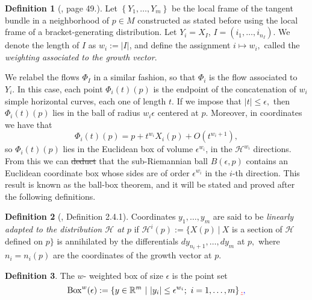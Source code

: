 \documentclass[12pt, letterpaper, reqno]{amsart}
\theoremstyle{definition}
\newtheorem{df}{Definition}
\theoremstyle{plain}
\theoremstyle{remark}
\providecommand{\DIFadd}[1]{{\protect\color{blue}\uwave{#1}}} %
\providecommand{\DIFdel}[1]{{\protect\color{red}\sout{#1}}}                      %
\providecommand{\DIFaddbegin}{} %
\providecommand{\DIFaddend}{} %
\providecommand{\DIFdelbegin}{} %
\providecommand{\DIFdelend}{} %
\newcommand{\DIFscaledelfig}{0.5}
\newlength{\DIFdelgraphicswidth} %
\newlength{\DIFdelgraphicsheight} %
\newcommand{\DIFaddincludegraphics}[2][]{{\color{blue}\fbox{\DIFOincludegraphics[#1]{#2}}}} %
\newcommand{\DIFdelincludegraphics}[2][]{%
\sbox{\DIFdelgraphicsbox}{\DIFOincludegraphics[#1]{#2}}%
\settoboxwidth{\DIFdelgraphicswidth}{\DIFdelgraphicsbox} %
\settoboxtotalheight{\DIFdelgraphicsheight}{\DIFdelgraphicsbox} %
\scalebox{\DIFscaledelfig}{%
\parbox[b]{\DIFdelgraphicswidth}{\usebox{\DIFdelgraphicsbox}\\[-\baselineskip] \rule{\DIFdelgraphicswidth}{0em}}\llap{\resizebox{\DIFdelgraphicswidth}{\DIFdelgraphicsheight}{%
\setlength{\unitlength}{\DIFdelgraphicswidth}%
\begin{picture}(1,1)%
\thicklines\linethickness{2pt} %
{\color[rgb]{1,0,0}\put(0,0){\framebox(1,1){}}}%
{\color[rgb]{1,0,0}\put(0,0){\line( 1,1){1}}}%
{\color[rgb]{1,0,0}\put(0,1){\line(1,-1){1}}}%
\end{picture}%
}\hspace*{3pt}}} %
} %
\DeclareRobustCommand{\DIFaddbegin}{\DIFOaddbegin \let\includegraphics\DIFaddincludegraphics} %
\DeclareRobustCommand{\DIFaddend}{\DIFOaddend \let\includegraphics\DIFOincludegraphics} %
\DeclareRobustCommand{\DIFdelbegin}{\DIFOdelbegin \let\includegraphics\DIFdelincludegraphics} %
\DeclareRobustCommand{\DIFdelend}{\DIFOaddend \let\includegraphics\DIFOincludegraphics} %
\begin{document}
\begin{df}[\cite{montgomery2002tour}, page 49.] Let $ \left\{ Y_1,\dots, Y_m \right\} $ be the local frame of the tangent bundle in a neighborhood of $ p\in M $ constructed as stated before using the local frame of a bracket-generating distribution. Let $ Y_i=X_I $, $ I=(i_1,\dots,i_{n_I}) $. We denote the length of $ I $ as $ w_i:= \left| I \right| $, and define the assignment $ i\mapsto w_i, $ called the \textit{weighting associated to the growth vector}. 

\end{df}

We relabel the flows $ \Phi_I $ in a similar fashion, so that $ \Phi_i $ is the flow associated to $ Y_i. $ In this case, each point $ \Phi_i(t)(p) $ is the endpoint of the concatenation of $ w_i $ simple horizontal curves, each one of length $ t $. If we impose that $ \left| t \right|\leq \epsilon, $ then $ \Phi_i(t)(p) $ lies in the ball of radius $ w_i\epsilon $ centered at $ p. $ Moreover, in coordinates we have that 
$$ \Phi_i(t)(p)=p+t^{w_i}X_i(p)+ O(t^{w_i+1}), $$ 
so $ \Phi_i(t)(p) $ lies in the Euclidean box of volume $ \epsilon^{w_i} $, in the $ \mathcal{H}^{w_i} $ directions. From this we can \DIFdelbegin \DIFdel{deduct }\DIFdelend \DIFaddbegin \DIFadd{deduce }\DIFaddend that the sub-Riemannian ball $ B(\epsilon,p) $ contains an Euclidean coordinate box whose sides are of order $ \epsilon^{w_i} $ in the $ i $-th direction. This result is known as the ball-box theorem, and it will be stated and proved after the following definitions.

\DIFdelbegin %
\DIFdelend \DIFaddbegin \begin{df}[\cite{montgomery2002tour}, Definition 2.4.1] 
	\DIFaddend Coordinates $ y_1,\dots,y_m $ are said to be \textit{linearly adapted to the distribution $\mathcal{H}$ at $ p $ } if $ \mathcal{H}^i(p):= \{ X(p) \ | \ X$ is a section of $\mathcal{H}$ defined on $p$$\}$ is annihilated by the differentials $ dy_{n_i+1},\dots, dy_m $ at $ p, $ where $ n_i=n_i(p) $ are the coordinates of the growth vector at $ p. $  
\end{df}
\begin{df}
	The $ w $- weighted box of size $ \epsilon $ is the point set
	$$ \operatorname{Box}^w(\epsilon) := \left\{ y\in \mathbb{R}^m \ | \ |y_i|\leq \epsilon^{w_i}; \ i=1,\dots,m \right\}\DIFdelbegin \DIFdel{.  }\DIFdelend \DIFaddbegin \DIFadd{,  }\DIFaddend $$
	\DIFaddbegin \DIFadd{where $ w=(w_1,\dots,w_m). $ 
}\DIFaddend \end{df}
\end{document}
